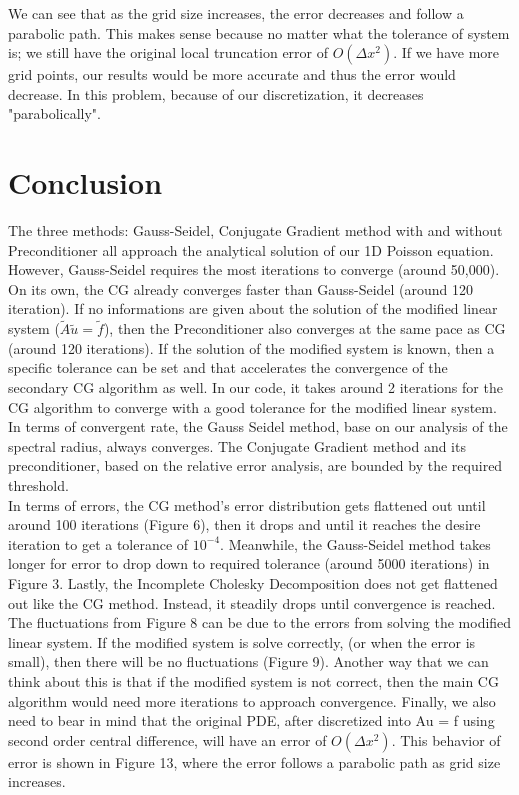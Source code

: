 \documentclass{article}
\begin{document}
\noindent
We can see that as the grid size increases, the error decreases and follow a parabolic path.  This makes sense because no matter what the tolerance of system is; we still have the original local truncation error of $O(\Delta x^2)$. If we have more grid points, our results would be more accurate and thus the error would decrease.  In this problem, because of our discretization, it decreases "parabolically". 

\newpage
\section{Conclusion}

The three methods: Gauss-Seidel, Conjugate Gradient method with and without Preconditioner all approach the analytical solution of our 1D Poisson equation. However, Gauss-Seidel requires the most iterations to converge (around 50,000).  On its own, the CG already converges faster than Gauss-Seidel (around 120 iteration).  If no informations are given about the solution of the modified linear system ($\tilde{A}\tilde{u}= \tilde{f}$), then the Preconditioner also converges at the same pace as CG (around 120 iterations). If the solution of the modified system is known, then a specific tolerance can be set and that accelerates the convergence of the secondary CG algorithm as well. In our code, it takes around 2 iterations for the CG algorithm to converge with a good tolerance for the modified linear system. \\

\noindent
In terms of convergent rate, the Gauss Seidel method, base on our analysis of the spectral radius, always converges. The Conjugate Gradient method and its preconditioner, based on the relative error analysis, are bounded by the required threshold. \\

\noindent
In terms of errors, the CG method's error distribution gets flattened out until around 100 iterations (Figure 6), then it drops and until it reaches the desire iteration to get a tolerance of $10^{-4}$.  Meanwhile, the Gauss-Seidel method takes longer for error to drop down to required tolerance (around 5000 iterations) in Figure 3. Lastly, the Incomplete Cholesky Decomposition does not get flattened out like the CG method.  Instead, it steadily drops until convergence is reached. The fluctuations from Figure 8 can be due to the errors from solving the modified linear system.  If the modified system is solve correctly, (or when the error is small), then there will be no fluctuations (Figure 9). Another way that we can think about this is that if the modified system is not correct, then the main CG algorithm would need more iterations to approach convergence.  Finally, we also need to bear in mind that the original PDE, after discretized into Au = f using second order central difference, will have an error of $O(\Delta x^2)$. This behavior of error is shown in Figure 13, where the error follows a parabolic path as grid size increases. 
\end{document}
